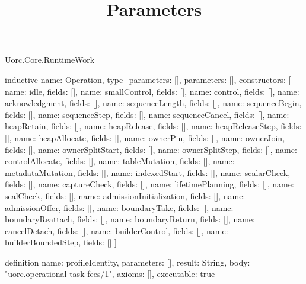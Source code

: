 \begin{lexlean}{Uorc.Core.RuntimeWork}
\title{Parameters}
\begin{semanticmodule}
inductive{
  name: Operation,
  type_parameters: [],
  parameters: [],
  constructors: [
    {name: idle, fields: []},
    {name: smallControl, fields: []},
    {name: control, fields: []},
    {name: acknowledgment, fields: []},
    {name: sequenceLength, fields: []},
    {name: sequenceBegin, fields: []},
    {name: sequenceStep, fields: []},
    {name: sequenceCancel, fields: []},
    {name: heapRetain, fields: []},
    {name: heapRelease, fields: []},
    {name: heapReleaseStep, fields: []},
    {name: heapAllocate, fields: []},
    {name: ownerPin, fields: []},
    {name: ownerJoin, fields: []},
    {name: ownerSplitStart, fields: []},
    {name: ownerSplitStep, fields: []},
    {name: controlAllocate, fields: []},
    {name: tableMutation, fields: []},
    {name: metadataMutation, fields: []},
    {name: indexedStart, fields: []},
    {name: scalarCheck, fields: []},
    {name: captureCheck, fields: []},
    {name: lifetimePlanning, fields: []},
    {name: sealCheck, fields: []},
    {name: admissionInitialization, fields: []},
    {name: admissionOffer, fields: []},
    {name: boundaryTake, fields: []},
    {name: boundaryReattach, fields: []},
    {name: boundaryReturn, fields: []},
    {name: cancelDetach, fields: []},
    {name: builderControl, fields: []},
    {name: builderBoundedStep, fields: []}
  ]
}

definition{
  name: profileIdentity,
  parameters: [],
  result: String,
  body: "uorc.operational-task-fees/1",
  axioms: [],
  executable: true
}


\end{semanticmodule}
\end{lexlean}

